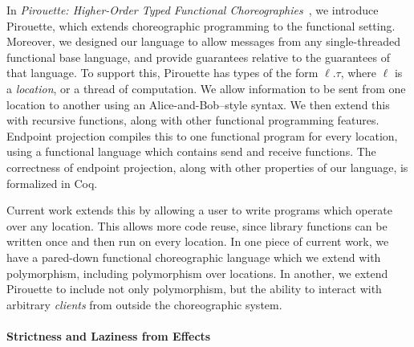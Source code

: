 \documentclass{article}
\theoremstyle{definition}
\begin{document}
In \textit{Pirouette: Higher-Order Typed Functional Choreographies}~\citep{HirschG22}, we introduce Pirouette, which extends choreographic programming to the functional setting.
Moreover, we designed our language to allow messages from any single-threaded functional base language, and provide guarantees relative to the guarantees of that language.
To support this, Pirouette has types of the form $\ell.\tau$, where $\ell$ is a \emph{location}, or a thread of computation.
We allow information to be sent from one location to another using an Alice-and-Bob--style syntax.
We then extend this with recursive functions, along with other functional programming features.
Endpoint projection compiles this to one functional program for every location, using a functional language which contains send and receive functions.
The correctness of endpoint projection, along with other properties of our language, is formalized in Coq.

Current work extends this by allowing a user to write programs which operate over any location.
This allows more code reuse, since library functions can be written once and then run on every location.
In one piece of current work, we have a pared-down functional choreographic language which we extend with polymorphism, including polymorphism over locations.
In another, we extend Pirouette to include not only polymorphism, but the ability to interact with arbitrary \emph{clients} from outside the choreographic system.


\paragraph{Strictness and Laziness from Effects}



\end{document}
